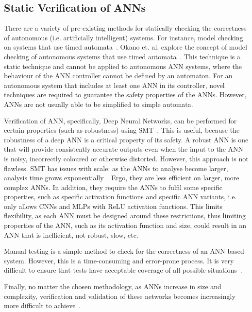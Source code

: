 \subsection{Static Verification of \acfp{ANN}}
There are a variety of pre-existing methods for statically checking the correctness of autonomous (i.e. artificially intelligent) systems.
For instance, model checking on systems that use timed automata~\cite{timed-enf-autonomous}.
Okano et. al. explore the concept of model checking of autonomous systems that use timed automata~\cite{timed-enf-autonomous}. 
This technique is a static technique and cannot be applied to autonomous \ac{ANN} systems, where the behaviour of the \ac{ANN} controller cannot be defined by an automaton.
For an autonomous system that includes at least one \ac{ANN} in its controller, novel techniques are required to guarantee the safety properties of the \acp{ANN}.
However, \acp{ANN} are not usually able to be simplified to simple automata.

Verification of \ac{ANN}, specifically, Deep Neural Networks, can be performed for certain properties (such as robustness) using \ac{SMT}~\cite{Gehr2018AI2SA,reluplex,DeepANNverify}.
This is useful, because the robustness of a deep \ac{ANN} is a critical property of its safety.
A robust \ac{ANN} is one that will provide consistently accurate outputs even when the input to the \ac{ANN} is noisy, incorrectly coloured or otherwise distorted. 
However, this approach is not flawless. 
\ac{SMT} has issues with scale: as the \acp{ANN} to analyse become larger, analysis time grows exponentially~\cite{Gehr2018AI2SA}.
Ergo, they are less efficient on larger, more complex \acp{ANN}.
In addition, they require the \acp{ANN} to fulfil some specific properties, such as specific activation functions and specific \ac{ANN} variants, i.e. \cite{Gehr2018AI2SA} only allows \acp{CNN} and \acp{MLP} with \ac{ReLU} activation functions.
This limits flexibility, as each \ac{ANN} must be designed around these restrictions, thus limiting properties of the \ac{ANN}, such as its activation function and size, could result in an \ac{ANN} that is inefficient, not robust, slow, etc.

Manual testing is a simple method to check for the correctness of an \ac{ANN}-based system. 
However, this is a time-consuming and error-prone process.
It is very difficult to ensure that tests have acceptable coverage of all possible situations~\cite{ANN-test}.

Finally, no matter the chosen methodology, as \acp{ANN} increase in size and complexity, verification and validation of these networks becomes increasingly more difficult to achieve~\cite{Gehr2018AI2SA}.

